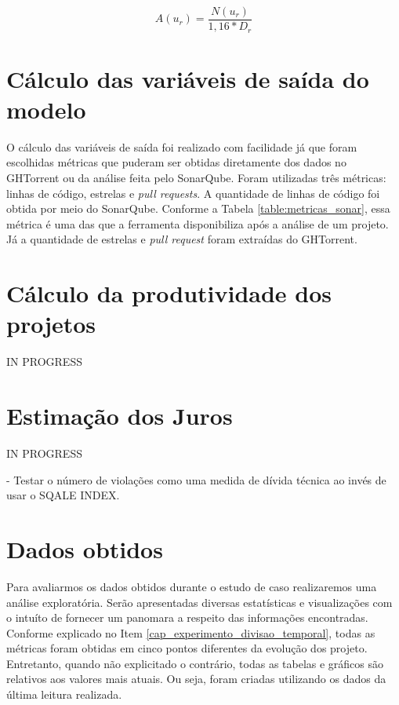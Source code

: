\begin{equation}
\label{eq:cap_calculo_assiduidade}
A(u_r) =  \frac{N(u_r)}{1,16 * D_r}
\end{equation}


\section{Cálculo das variáveis de saída do modelo}

O cálculo das variáveis de saída foi realizado com facilidade já que foram escolhidas métricas que puderam ser obtidas diretamente dos dados no GHTorrent ou da análise feita pelo SonarQube. Foram utilizadas três métricas: linhas de código, estrelas e \textit{pull requests}.  A quantidade de linhas de código foi obtida por meio do SonarQube. Conforme a Tabela \ref{table:metricas_sonar}, essa métrica é uma das que a ferramenta disponibiliza após a análise de um projeto. Já a quantidade de estrelas e \textit{pull request} foram extraídas do GHTorrent. 

\section{Cálculo da produtividade dos projetos}

IN PROGRESS

\section{Estimação dos Juros}

IN PROGRESS

- Testar o número de violações como uma medida de dívida técnica ao invés de usar o SQALE INDEX.



\section{Dados obtidos}

Para avaliarmos os dados obtidos durante o estudo de caso realizaremos uma análise exploratória. Serão apresentadas diversas estatísticas e visualizações com o intuíto de fornecer um panomara a respeito das informações encontradas. Conforme explicado no Item \ref{cap_experimento_divisao_temporal}, todas as métricas foram obtidas em cinco pontos diferentes da evolução dos projeto. Entretanto,  quando não explicitado o contrário, todas as tabelas e gráficos são relativos aos valores mais atuais. Ou seja, foram criadas utilizando os dados da última leitura realizada. 



